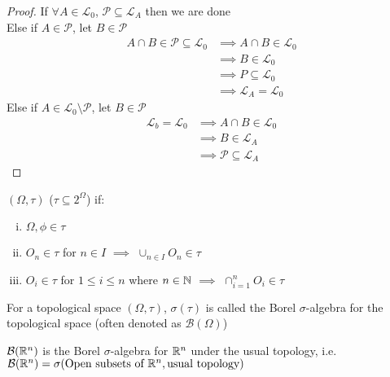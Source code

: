 \begin{proof}
	If $\forall A \in \mathcal L_0$, $\mathcal P \subseteq \mathcal L_A$ then we are done \\
	Else if $A \in \mathcal P$, let $B \in \mathcal P$
	\begin{align*}
		A \cap B \in \mathcal P \subseteq \mathcal L_0 &\implies A \cap B \in \mathcal L_0 \\
		&\implies B \in \mathcal L_0 \\
		&\implies P \subseteq \mathcal L_0 \\
		&\implies \mathcal L_A = \mathcal L_0
	\end{align*}
	Else if  $A \in \mathcal L_0 \setminus \mathcal P$, let $B \in \mathcal P$
	\begin{align*}
		\mathcal L_b = \mathcal L_0 &\implies A \cap B \in \mathcal L_0 \\
		&\implies B \in \mathcal L_A \\
		&\implies \mathcal P \subseteq \mathcal L_A
	\end{align*}
\end{proof}

\begin{definition}
	$(\Omega, \tau)$ ($\tau \subseteq 2^\Omega$) if:
	\begin{enumerate}[i)]
		\item $\Omega, \phi \in \tau$
		\item $O_n \in \tau$ for $n \in I$ $\implies$ $\cup_{n \in I} O_n \in \tau$
		\item $O_i \in \tau$ for $1 \leq i \leq n$ where $n \in \mathbb N$ $\implies$ $\cap_{i=1}^n O_i \in \tau$
	\end{enumerate}
\end{definition}

\begin{definition}
	For a topological space $(\Omega, \tau)$, $\sigma(\tau)$ is called the Borel $\sigma$-algebra for the topological space (often denoted as $\mathcal B(\Omega)$)
\end{definition}

\begin{example}
	[$\mathcal B(\RR^n)$]
	$\mathcal B(\RR^n)$ is the Borel $\sigma$-algebra for $\mathbb R^n$ under the usual topology, i.e. $\mathcal B(\mathbb R^n)=\sigma(\text{Open subsets of }\mathbb R^n,\text{usual topology})$
\end{example}
